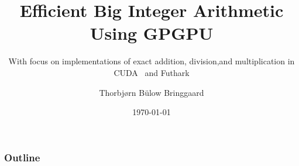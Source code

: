 \documentclass{beamer}
\author{Thorbjørn Bülow Bringgaard}
\title{Efficient Big Integer Arithmetic Using GPGPU}
\subtitle{With focus on implementations of exact addition, division,\newline and multiplication in CUDA \cpp\ and Futhark}
\institute{University of Copenhagen\newline Department of Computer Science}
\date{\today}
\begin{document}
\begin{frame}
    \titlepage
\end{frame}

\logo{}

\begin{frame}
    \frametitle{Outline}
    \tableofcontents
\end{frame}










\end{document}
